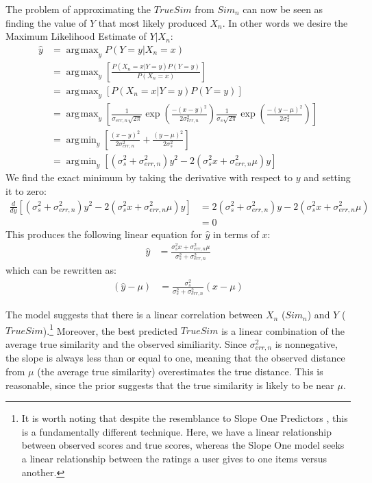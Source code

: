 \documentclass[11pt]{article}
\DeclareMathOperator*{\argmax}{arg\!\max}
\DeclareMathOperator*{\argmin}{arg\!\min}
\begin{document}
The problem of approximating the $TrueSim$ from $Sim_n$ can now be seen as
finding the value of $Y$ that most likely produced $X_n$. In other words we 
desire the Maximum Likelihood Estimate of $Y | X_n$:
\begin{align}
\hat{y} &= \argmax_yP(Y=y|X_n=x) 
\\&= \argmax_y\left[\frac{P(X_n=x | Y=y)P(Y=y)}{P(X_n=x)}\right]
\\&= \argmax_y\left[P(X_n=x|Y=y)P(Y=y)\right]
\\&= 
\argmax_y\left[\frac{1}{\sigma_{err,n}\sqrt{2\pi}}\exp{\left(\frac{-(x-y)^2}
{2\sigma_{err,n}^2}\right)}
\frac{1}{\sigma_{s}\sqrt{2\pi}}\exp{\left(\frac{-(y-\mu)^2}
{2\sigma_{s}^2}\right)}\right]
\\&= \argmin_y\left[\frac{(x-y)^2}{2\sigma_{err,n}^2} +
\frac{(y-\mu)^2}{2\sigma_{s}^2}\right]
\\&= \argmin_y\left[\left(\sigma_{s}^2+\sigma_{err,n}^2\right)y^2 - 
2\left(\sigma_{s}^2x+\sigma_{err,n}^2\mu\right)y\right]
\end{align}
We find the exact minimum by taking the derivative with respect to $y$ and
setting it to zero:
\begin{align}
\frac{d}{dy}\left[\left(\sigma_{s}^2+\sigma_{err,n}^2\right)y^2 - 
2\left(\sigma_{s}^2x+\sigma_{err,n}^2\mu\right)y\right]
&= 2\left(\sigma_{s}^2+\sigma_{err,n}^2\right)y - 
2\left(\sigma_{s}^2x+\sigma_{err,n}^2\mu\right) 
\\&= 0
\end{align}
This produces the following linear equation for $\hat{y}$ in terms of $x$:
\begin{align}
\hat{y} &= \frac{\sigma_{s}^2x+\sigma_{err,n}^2\mu}{\sigma_{s}^2+\sigma_{err,n}^2}
\end{align}
which can be rewritten as:
\begin{align}
\left(\hat{y} - \mu\right) &= \frac{\sigma_{s}^2}{\sigma_{s}^2+\sigma_{err,n}^2}
\left(x-\mu\right)
\end{align}

The model suggests that there is a linear correlation between $X_n$ ($Sim_n$)
and $Y$ ($TrueSim$).\footnote{It is worth noting that despite
the resemblance to Slope One Predictors \cite{Lemire1998}, this is a fundamentally 
different technique. Here, we have a linear relationship between observed 
scores and true scores, whereas the Slope One model seeks a linear relationship 
between the ratings a user gives to one items versus another.} 
Moreover, the best predicted $TrueSim$ is a linear 
combination of the average true similarity and the observed similiarity. Since $\sigma_{err,n}^2$ is 
nonnegative, the slope is always less than or equal to one, meaning that the 
observed distance from $\mu$ (the average true similarity) overestimates the 
true distance. This is reasonable, since the prior suggests that the true 
similarity is likely to be near $\mu$.
\end{document}
